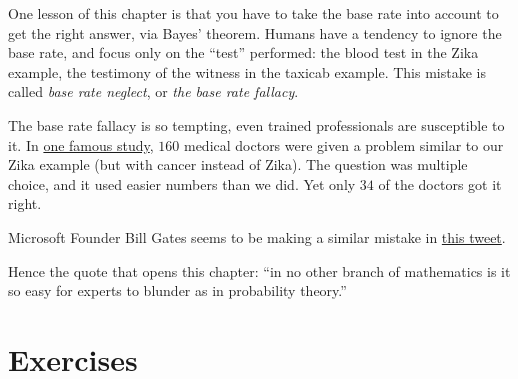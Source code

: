 \documentclass[justified]{tufte-book}
\theoremstyle{definition}
\theoremstyle{definition}
\theoremstyle{definition}
\theoremstyle{remark}
\begin{document}
One lesson of this chapter is that you have to take the base rate into account to get the right answer, via Bayes' theorem. Humans have a tendency to ignore the base rate, and focus only on the ``test'' performed: the blood test in the Zika example, the testimony of the witness in the taxicab example. This mistake is called \emph{base rate neglect}, or \emph{the base rate fallacy}.

The base rate fallacy is so tempting, even trained professionals are susceptible to it. In \href{https://www.stat.berkeley.edu/~aldous/157/Papers/health_stats.pdf}{one famous study}, \(160\) medical doctors were given a problem similar to our Zika example (but with cancer instead of Zika). The question was multiple choice, and it used easier numbers than we did. Yet only \(34\) of the doctors got it right.

\begin{marginfigure}
Microsoft Founder Bill Gates seems to be making a similar mistake in
\href{https://twitter.com/BillGates/status/1118196606975787008}{this
tweet}.
\end{marginfigure}

Hence the quote that opens this chapter: ``in no other branch of mathematics is it so easy for experts to blunder as in probability theory.''

\hypertarget{exercises-6}{%
\section*{Exercises}\label{exercises-6}}
\end{document}
